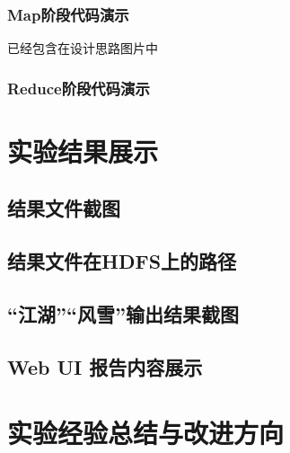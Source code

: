 \documentclass[a4paper,UTF8]{article}
\numberwithin{equation}{section}
\begin{document}
\subsubsection{Map阶段代码演示}
已经包含在设计思路图片中

\subsubsection{Reduce阶段代码演示}

\section{实验结果展示}
\subsection{结果文件截图}

\subsection{结果文件在HDFS上的路径}

\subsection{“江湖”“风雪”输出结果截图}

\subsection{Web UI 报告内容展示}

\section{实验经验总结与改进方向}











\end{document}
